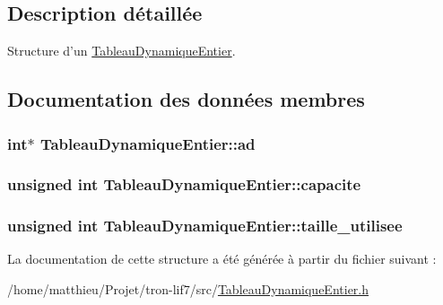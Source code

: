\subsection{Description détaillée}
Structure d'un \hyperlink{structTableauDynamiqueEntier}{Tableau\-Dynamique\-Entier}. 

\subsection{Documentation des données membres}
\hypertarget{structTableauDynamiqueEntier_a2ebf85c435f6e7db67050c4fbcaf62a9}{
\subsubsection[{ad}]{\setlength{\rightskip}{0pt plus 5cm}int$\ast$ Tableau\-Dynamique\-Entier\-::ad}}\label{structTableauDynamiqueEntier_a2ebf85c435f6e7db67050c4fbcaf62a9}
\hypertarget{structTableauDynamiqueEntier_a1fbdd8e4a11ba95e5a802fe9bb6cc2ff}{
\subsubsection[{capacite}]{\setlength{\rightskip}{0pt plus 5cm}unsigned int Tableau\-Dynamique\-Entier\-::capacite}}\label{structTableauDynamiqueEntier_a1fbdd8e4a11ba95e5a802fe9bb6cc2ff}
\hypertarget{structTableauDynamiqueEntier_ac7a23b3a002b4ce72556a1d5cebd3025}{
\subsubsection[{taille\-\_\-utilisee}]{\setlength{\rightskip}{0pt plus 5cm}unsigned int Tableau\-Dynamique\-Entier\-::taille\-\_\-utilisee}}\label{structTableauDynamiqueEntier_ac7a23b3a002b4ce72556a1d5cebd3025}


La documentation de cette structure a été générée à partir du fichier suivant \-:\begin{DoxyCompactItemize}
\item 
/home/matthieu/\-Projet/tron-\/lif7/src/\hyperlink{TableauDynamiqueEntier_8h}{Tableau\-Dynamique\-Entier.\-h}\end{DoxyCompactItemize}
